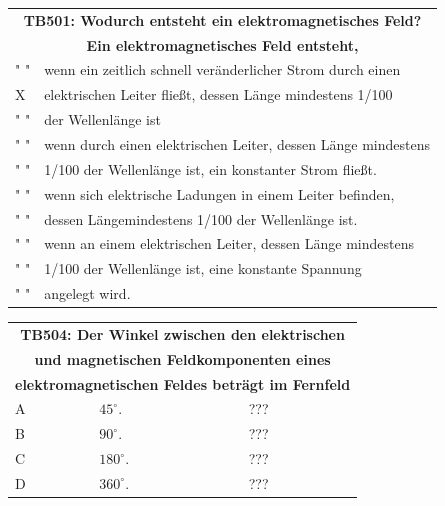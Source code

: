 \begin{frame}
	\begin{center}
	\begin{small}
	\begin{tabular}{|l|l|}
		\hline
		\multicolumn{2}{|c|}{\textbf{TB501: Wodurch entsteht ein elektromagnetisches Feld? }}\\
		\multicolumn{2}{|c|}{\textbf{Ein elektromagnetisches Feld entsteht,}}\\
		\hline
		" " & wenn ein zeitlich schnell veränderlicher Strom durch einen \\
		X & elektrischen Leiter fließt, dessen Länge mindestens 1/100 \\
		" " & der Wellenlänge ist \\ \hline
		" " & wenn durch einen elektrischen Leiter, dessen Länge mindestens \\
		" " & 1/100 der Wellenlänge ist, ein konstanter Strom fließt. \\ \hline
		" " & wenn sich elektrische Ladungen in einem Leiter befinden, \\
		" " & dessen Längemindestens 1/100 der Wellenl\"ange ist. \\ \hline
		" " & wenn an einem elektrischen Leiter, dessen Länge mindestens \\
		" " & 1/100 der Wellenlänge ist, eine konstante Spannung \\ 
		" " & angelegt wird. \\ \hline
	\end{tabular}
	\end{small}		
	\end{center}
\end{frame}

\begin{frame}
	\begin{center}
	\begin{tabular}{|l|l|l|}
		\hline
		\multicolumn{3}{|c|}{\textbf{TB504:  Der Winkel zwischen den elektrischen}}\\
		\multicolumn{3}{|c|}{\textbf{und magnetischen Feldkomponenten eines}}\\
		\multicolumn{3}{|c|}{\textbf{elektromagnetischen Feldes beträgt im Fernfeld}}\\
		\hline
		A & $45^\circ$.  & ??? \\ \hline
		B & $90^\circ$.  & ??? \\ \hline
		C & $180^\circ$. & ??? \\ \hline
		D & $360^\circ$. & ??? \\ \hline
	\end{tabular}
	\end{center}
\end{frame}

